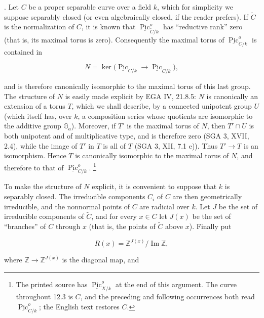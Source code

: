 \medskip
{}. Let $C$ be a proper separable curve over a field $k$, which for
simplicity we suppose separably closed (or even algebraically closed, if
the reader prefers). If $\widetilde C$ is the normalization of $C$, it is
known that $\underline{\operatorname{Pic}}^o_{\widetilde C/k}$ has
``reductive rank'' zero (that is, its maximal torus is zero). Consequently
the maximal torus of $\underline{\operatorname{Pic}}^o_{C/k}$ is contained
in

\begin{equation*}
 N=\ker\bigl(\underline{\operatorname{Pic}}_{C/k}
       \longrightarrow\underline{\operatorname{Pic}}_{\widetilde C/k}\bigr),
\end{equation*}

\noindent
and is therefore canonically isomorphic to the maximal torus of this last
group. The structure of $N$ is easily made explicit by EGA IV, 21.8.5:
$N$ is canonically an extension of a torus $T$, which we shall describe,
by a connected unipotent group $U$ (which itself has, over $k$, a
composition series whose quotients are isomorphic to the additive group
$\mathbb G_a$). Moreover, if $T'$ is the maximal torus of $N$, then
$T'\cap U$ is both unipotent and of multiplicative type, and is therefore
zero (SGA 3, XVII, 2.4), while the image of $T'$ in $T$ is all of $T$
(SGA 3, XII, 7.1 e)). Thus $T'\to T$ is an isomorphism. Hence $T$ is
canonically isomorphic to the maximal torus of $N$, and therefore to that
of $\underline{\operatorname{Pic}}^o_{C/k}$.
\footnote{The printed source has $\underline{\operatorname{Pic}}^o_{X/k}$
at the end of this argument. The curve throughout 12.3 is $C$, and the
preceding and following occurrences both read
$\underline{\operatorname{Pic}}^o_{C/k}$; the English text restores $C$.}

To make the structure of $N$ explicit, it is convenient to suppose that
$k$ is separably closed. The irreducible components $C_i$ of $C$ are then
geometrically irreducible, and the nonnormal points of $C$ are radicial
over $k$. Let $J$ be the set of irreducible components of $\widetilde C$,
and for every $x\in C$ let $J(x)$ be the set of ``branches'' of $C$ through
$x$ (that is, the points of $\widetilde C$ above $x$). Finally put

\begin{equation}\tag{12.3.1}
 R(x)=\mathbb Z^{J(x)}/\operatorname{Im}\mathbb Z,
\end{equation}

\noindent
where $\mathbb Z\to\mathbb Z^{J(x)}$ is the diagonal map, and

